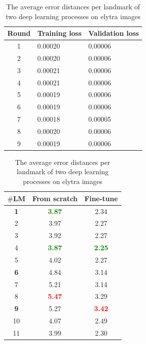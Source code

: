 \documentclass[review]{elsarticle}
\begin{document}
\begin{table}[htbp]
	\begin{minipage}[t]{0.45\textwidth}
	\centering
	\begin{tabular}{c p{1.5cm} p{1.5cm}}
	Round & Training loss & Validation loss \\ \hline
	1 & 0.00020 & 0.00006  \\ \hline
	2 & 0.00020 & 0.00006 \\ \hline
	3 & 0.00021 & 0.00006 \\ \hline
	4 & 0.00021 & 0.00006 \\ \hline
	5 & 0.00019 & 0.00006 \\ \hline
	6 & 0.00019 & 0.00006 \\ \hline
	7 & 0.00018 & 0.00005 \\ \hline
	8 & 0.00020 & 0.00006 \\ \hline
	9 & 0.00019 & 0.00006 \\ \hline
	\end{tabular}
	\caption{The losses during fine-tuning model on elytra dataset}
	\label{tblftbody}
\end{minipage}
\hfill
\begin{minipage}[t]{0.45\textwidth}
\centering
\begin{tabular}{|c|c|c|}
\hline
\textbf{$\#$LM} & \textbf{From scratch} & \textbf{Fine-tune} \\ \hline
\textbf{1} & \textcolor{green}{\textbf{3.87}} & 2.34  \\ \hline
2 & 3.97 & 2.27  \\ \hline
3 & 3.92  & 2.27 \\ \hline
4 & \textcolor{green}{\textbf{3.87}}  & \textcolor{green}{\textbf{2.25}} \\ \hline
5 & 4.02  & 2.27 \\ \hline
\textbf{6} & 4.84  & 3.14 \\ \hline
7 & 5.21  & 3.14 \\ \hline
8 & \textcolor{red}{\textbf{5.47}}  & 3.29 \\ \hline
\textbf{9} & 5.27  & \textcolor{red}{\textbf{3.42}} \\ \hline
10 & 4.07  & 2.49 \\ \hline
11 & 3.99  & 2.30 \\ \hline
\end{tabular}
\caption{The average error distances per landmark of two deep learning processes on elytra images}
\label{tblcmpbody}
\end{minipage}
\end{table}
\end{document}
